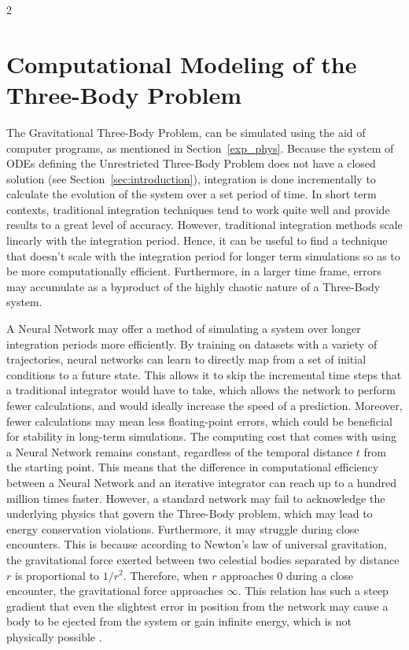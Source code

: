 \documentclass{article}
\begin{document}
\begin{multicols}{2}
\section{Computational Modeling of the Three-Body Problem}
\label{sec:comp_modeling}
The Gravitational Three-Body Problem, can be simulated using the aid of computer programs, as mentioned in Section~\ref{exp_phys}. Because the system of ODEs defining the Unrestricted Three-Body Problem does not have a closed solution (see Section~\ref{sec:introduction}), integration is done incrementally to calculate the evolution of the system over a set period of time. In short term contexts, traditional integration techniques tend to work quite well and provide results to a great level of accuracy. However, traditional integration methods scale linearly with the integration period. Hence, it can be useful to find a technique that doesn't scale with the integration period for longer term simulations so as to be more computationally efficient. Furthermore, in a larger time frame, errors may accumulate as a byproduct of the highly chaotic nature of a Three-Body system. 

A Neural Network may offer a method of simulating a system over longer integration periods more efficiently. By training on datasets with a variety of trajectories, neural networks can learn to directly map from a set of initial conditions to a future state. This allows it to skip the incremental time steps that a traditional integrator would have to take, which allows the network to perform fewer calculations, and would ideally increase the speed of a prediction. Moreover, fewer calculations may mean less floating-point errors, which could be beneficial for stability in long-term simulations. The computing cost that comes with using a Neural Network remains constant, regardless of the temporal distance $t$ from the starting point. This means that the difference in computational efficiency between a Neural Network and an iterative integrator can reach up to a hundred million times faster. However, a standard network may fail to acknowledge the underlying physics that govern the Three-Body problem, which may lead to energy conservation violations. Furthermore, it may struggle during close encounters. This is because according to Newton's law of universal gravitation, the gravitational force exerted between two celestial bodies separated by distance $r$ is proportional to $1/r^2$. Therefore, when $r$ approaches $0$ during a close encounter, the gravitational force approaches $\infty$. This relation has such a steep gradient that even the slightest error in position from the network may cause a body to be ejected from the system or gain infinite energy, which is not physically possible \cite{Dehnen2001}.


\end{multicols}
\end{document}
